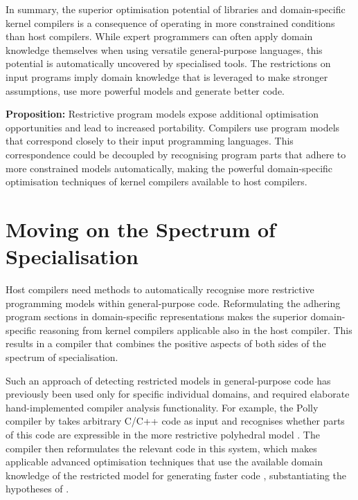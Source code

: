     In summary, the superior optimisation potential of libraries and
    domain-specific kernel compilers is a consequence of operating in more
    constrained conditions than host compilers.
    While expert programmers can often apply domain knowledge themselves
    when using versatile general-purpose languages, this potential is
    automatically uncovered by specialised tools.
    The restrictions on input programs imply domain knowledge that is leveraged
    to make stronger assumptions, use more powerful models and generate better
    code.

    {\bf Proposition:}\quad
    Restrictive program models expose additional optimisation
    opportunities and lead to increased portability.
    Compilers use program models that correspond closely to their input
    programming languages.
    This correspondence could be decoupled by recognising program parts that
    adhere to more constrained models automatically, making the powerful
    domain-specific optimisation techniques of kernel compilers available to
    host compilers.

\section{Moving on the Spectrum of Specialisation}

    Host compilers need methods to automatically recognise more
    restrictive programming models within general-purpose code.
    Reformulating the adhering program sections in domain-specific
    representations makes the superior domain-specific reasoning from kernel
    compilers applicable also in the host compiler.
    This results in a compiler that combines the positive aspects of both sides
    of the spectrum of specialisation.

    Such an approach of detecting restricted models in general-purpose code has
    previously been used only for specific individual domains, and required
    elaborate hand-implemented compiler analysis functionality.
    For example, the Polly compiler by \citet{Lengauer2012Polly} takes
    arbitrary C/C++ code as input and recognises whether parts of this code
    are expressible in the more restrictive polyhedral model
    \citep{Karp:1967:OCU:321406.321418,benabderrahmane2010polyhedral}.
    The compiler then reformulates the relevant code in this system, which
    makes applicable advanced optimisation techniques that use the available
    domain knowledge of the restricted model for generating faster code
    \citep{Moll:2016:ISS:2892208.2892217,Doerfert2015Polly}, substantiating the
    hypotheses of .

